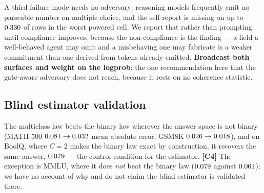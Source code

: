 A third failure mode needs no adversary: reasoning models frequently emit no
parseable number on multiple choice, and the self-report is missing on up to
$0.330$ of rows in the worst powered cell. We report that
rather than prompting until compliance improves, because the non-compliance is
the finding --- a field a well-behaved agent may omit and a misbehaving one may
fabricate is a weaker commitment than one derived from tokens already emitted.
\textbf{Broadcast both surfaces and weight on the logprob}: the one
recommendation here that the gate-aware adversary does not reach, because it
rests on no coherence statistic.

\subsection{Blind estimator validation}

The multiclass law beats the binary law wherever the answer space is not binary
(MATH-500 $0.081 \to 0.032$ mean absolute error,
GSM8K $0.026 \to 0.018$), and on BoolQ, where $C=2$ makes the
binary law exact by construction, it recovers the same answer,
$0.079$ --- the control condition for the estimator. \textbf{[C4]} The
exception is MMLU, where it does \emph{not} beat the binary law
($0.079$ against $0.061$); we have no account of why and do
not claim the blind estimator is validated there.
